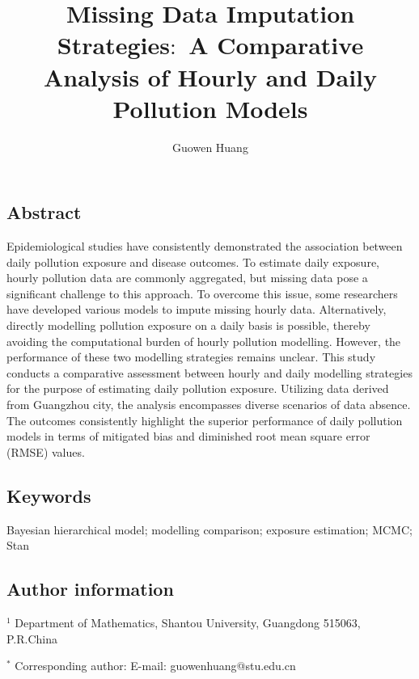 \documentclass[
  12,
]{article}
\title{Missing Data Imputation Strategies\(:\) A Comparative Analysis of Hourly and Daily Pollution Models}
\author{Guowen Huang}
\date{}
\begin{document}
\maketitle

\hypertarget{abstract}{%
\subsection*{Abstract}\label{abstract}}

\linenumbers

Epidemiological studies have consistently demonstrated the association
between daily pollution exposure and disease outcomes. To estimate daily
exposure, hourly pollution data are commonly aggregated, but missing
data pose a significant challenge to this approach. To overcome this
issue, some researchers have developed various models to impute missing hourly data.
Alternatively, directly modelling pollution exposure on a daily basis is
possible, thereby avoiding the computational burden of hourly pollution
modelling. However, the performance of these two modelling strategies
remains unclear. This study conducts a comparative assessment between
hourly and daily modelling strategies for the purpose of estimating
daily pollution exposure. Utilizing data derived from Guangzhou city,
the analysis encompasses diverse scenarios of data absence. The outcomes
consistently highlight the superior performance of daily pollution
models in terms of mitigated bias and diminished root mean square error
(RMSE) values. 

\hypertarget{keywords}{%
\subsection*{Keywords}\label{keywords}}

Bayesian hierarchical model; modelling comparison; exposure estimation;
MCMC; Stan

\hypertarget{author-information}{%
\subsection*{Author information}\label{author-information}}

\(^1\) Department of Mathematics, Shantou University, Guangdong 515063,
P.R.China

\(^*\) Corresponding author: E-mail: guowenhuang@stu.edu.cn
\end{document}
